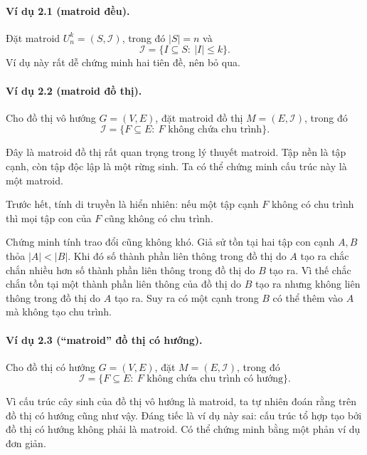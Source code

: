 \documentclass[11pt]{article}
\begin{document}
\paragraph{Ví dụ 2.1 (matroid đều).}
Đặt matroid \(U_n^k=(S,\mathcal I)\), trong đó \(|S|=n\) và
\[
  \mathcal I=\{I\subseteq S:\ |I|\le k\}.
\]
Ví dụ này rất dễ chứng minh hai tiên đề, nên bỏ qua.

\paragraph{Ví dụ 2.2 (matroid đồ thị).}
Cho đồ thị vô hướng \(G=(V,E)\), đặt matroid đồ thị \(M=(E,\mathcal I)\), trong
đó
\[
  \mathcal I=\{F\subseteq E:\ F\text{ không chứa chu trình}\}.
\]

Đây là matroid đồ thị rất quan trọng trong lý thuyết matroid. Tập nền là tập
cạnh, còn tập độc lập là một rừng sinh. Ta có thể chứng minh cấu trúc này là
một matroid.

Trước hết, tính di truyền là hiển nhiên: nếu một tập cạnh \(F\) không có chu
trình thì mọi tập con của \(F\) cũng không có chu trình.

Chứng minh tính trao đổi cũng không khó. Giả sử tồn tại hai tập con cạnh
\(A,B\) thỏa \(|A|<|B|\). Khi đó số thành phần liên thông trong đồ thị do \(A\)
tạo ra chắc chắn nhiều hơn số thành phần liên thông trong đồ thị do \(B\) tạo
ra. Vì thế chắc chắn tồn tại một thành phần liên thông của đồ thị do \(B\) tạo
ra nhưng không liên thông trong đồ thị do \(A\) tạo ra. Suy ra có một cạnh trong
\(B\) có thể thêm vào \(A\) mà không tạo chu trình.

\paragraph{Ví dụ 2.3 (``matroid'' đồ thị có hướng).}
Cho đồ thị có hướng \(G=(V,E)\), đặt \(M=(E,\mathcal I)\), trong đó
\[
  \mathcal I=\{F\subseteq E:\ F\text{ không chứa chu trình có hướng}\}.
\]

Vì cấu trúc cây sinh của đồ thị vô hướng là matroid, ta tự nhiên đoán rằng trên
đồ thị có hướng cũng như vậy. Đáng tiếc là ví dụ này sai: cấu trúc tổ hợp tạo
bởi đồ thị có hướng không phải là matroid. Có thể chứng minh bằng một phản ví dụ
đơn giản.

\begin{center}
\end{center}
\end{document}
